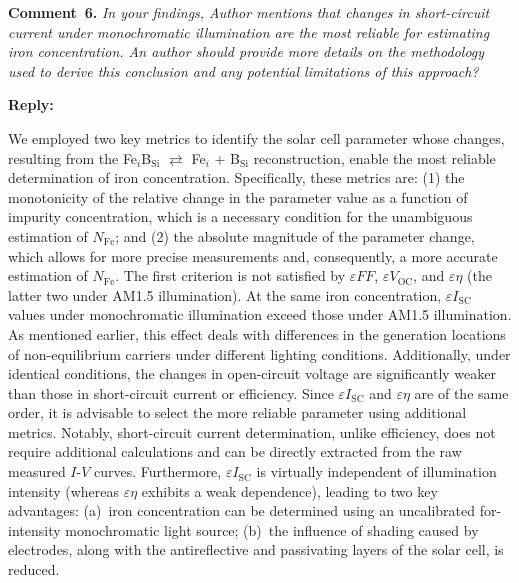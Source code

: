 \documentclass[a4paper,fleqn]{cas-sc}
\begin{document}
\vspace{1cm}
\noindent
\textcolor[rgb]{0.00,0.50,1.00}{\textbf{Comment~6.}}
\emph{In your findings, Author mentions that changes in short-circuit current under monochromatic illumination are the most
reliable for estimating iron concentration.
An author should provide more details on the methodology used to derive this conclusion and any potential limitations of this approach?}



\noindent
\textcolor[rgb]{0.51,0.00,0.00}{\textbf{Reply:}}

We employed two key metrics to identify the solar cell parameter whose changes, 
resulting from the Fe$_i$B$_\mathrm{Si}$ $\rightleftarrows$ Fe$_i$ + B$_\mathrm{Si}$ reconstruction, 
enable the most reliable determination of iron concentration.
Specifically, these metrics are: 
(1) the monotonicity of the relative change in the parameter value as a function of impurity concentration, 
which is a necessary condition for the unambiguous estimation of $N_\mathrm{Fe}$;
and (2) the absolute magnitude of the parameter change, which allows for more precise measurements and, 
consequently, a more accurate estimation of $N_\mathrm{Fe}$.
The first criterion is not satisfied by $\varepsilon F\!F$, $\varepsilon V_\mathrm{OC}$, and $\varepsilon \eta$
(the latter two under AM1.5 illumination).
At the same iron concentration, $\varepsilon I_\mathrm{SC}$ values under monochromatic illumination exceed those under AM1.5 illumination. 
As mentioned earlier, this effect deals with differences in the generation locations 
of non-equilibrium carriers under different lighting conditions.
Additionally, under identical conditions, the changes in open-circuit voltage are significantly weaker 
than those in short-circuit current or efficiency.
Since $\varepsilon I_\mathrm{SC}$ and $\varepsilon \eta$ are of the same order, 
it is advisable to select the more reliable parameter using additional metrics.
Notably, short-circuit current determination, unlike efficiency, does not require additional calculations 
and can be directly extracted from the raw measured $I$-$V$ curves.
Furthermore, $\varepsilon I_\mathrm{SC}$ is virtually independent of illumination intensity 
(whereas $\varepsilon \eta$ exhibits a weak dependence), leading to two key advantages:
(a)~iron concentration can be determined using an uncalibrated for-intensity monochromatic light source;
(b)~the influence of shading caused by electrodes, along with the antireflective and passivating layers of the solar cell, is reduced.
\end{document}
